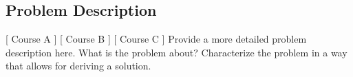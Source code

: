 \subsection{Problem Description}
[ Course A ] [ Course B ] [ Course C ] 
\newline
Provide a more detailed problem description here. What is the problem about? Characterize the problem in a way that allows for deriving a solution.
